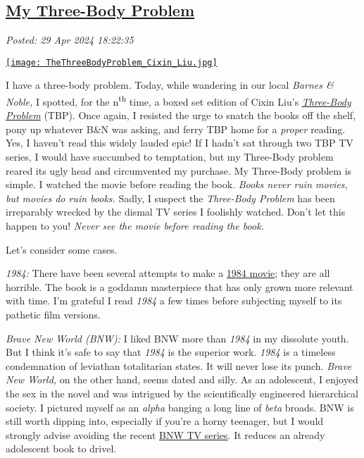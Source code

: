 %

\subsection*{\href{http://analyzethedatanotthedrivel.org/2024/04/29/my-three-body-problem/}{My Three-Body Problem}}


\noindent\emph{Posted: 29 Apr 2024 18:22:35}
\vspace{6pt}

\captionsetup[floatingfigure]{labelformat=empty}
\begin{floatingfigure}[l]{0.23\textwidth}
\centering
\href{https://www.barnesandnoble.com/w/the-three-body-problem-cixin-liu/1119317099}{\texttt{[image: TheThreeBodyProblem\_Cixin\_Liu.jpg]}}
\label{fig:8124x0} \end{floatingfigure} I have a three-body problem. Today, while wandering in our local
\emph{Barnes \& Noble,} I spotted, for the n\textsuperscript{th} time, a
boxed set edition of Cixin Liu's \href{https://www.barnesandnoble.com/w/the-three-body-problem-cixin-liu/1119317099}{\emph{Three-Body Problem}} (TBP). Once
again, I resisted the urge to snatch the books off the shelf, pony up
whatever B\&N was asking, and ferry TBP home for a \emph{proper}
reading. Yes, I haven't read this widely lauded epic! If I hadn't sat
through two TBP TV series, I would have succumbed to temptation, but my
Three-Body problem reared its ugly head and circumvented my purchase. My
Three-Body problem is simple. I watched the movie before reading the
book. \emph{Books never ruin movies, but movies do ruin books.} Sadly, I
suspect the \emph{Three-Body Problem} has been irreparably wrecked by
the dismal TV series I foolishly watched. Don't let this happen to you!
\emph{Never see the movie before reading the book.}

Let's consider some cases.

\emph{1984:} There have been several attempts to make a
\href{https://en.wikipedia.org/wiki/Adaptations_of_Nineteen_Eighty-Four}{1984
movie}; they are all horrible. The book is a goddamn masterpiece that
has only grown more relevant with time. I'm grateful I read \emph{1984}
a few times before subjecting myself to its pathetic film versions.

\emph{Brave New World (BNW):} I liked BNW more than \emph{1984} in my
dissolute youth. But I think it's safe to say that \emph{1984} is the
superior work. \emph{1984} is a timeless condemnation of leviathan
totalitarian states. It will never lose its punch. \emph{Brave New
World,} on the other hand, seems dated and silly. As an adolescent, I enjoyed the 
sex in the novel and was intrigued by the
scientifically engineered hierarchical society. I pictured myself as an
\emph{alpha} banging a long line of \emph{beta} broads. BNW is still
worth dipping into, especially if you're a horny teenager, but I would
strongly advise avoiding the recent \href{https://www.imdb.com/title/tt9814116/}{BNW TV series}. It reduces
an already adolescent book to drivel.

